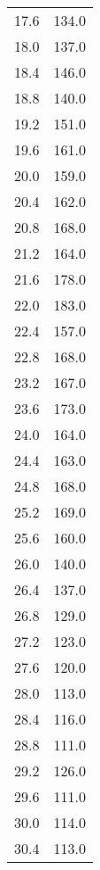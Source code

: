\begin{table}[htp]
\begin{center}
\begin{tabular}{cc}
                        17.6 & 134.0\\
                        18.0 & 137.0\\
                        18.4 & 146.0\\
                        18.8 & 140.0\\
                        19.2 & 151.0\\
                        19.6 & 161.0\\
                        20.0 & 159.0\\
                        20.4 & 162.0\\
                        20.8 & 168.0\\
                        21.2 & 164.0\\
                        21.6 & 178.0\\
                        22.0 & 183.0\\
                        22.4 & 157.0\\
                        22.8 & 168.0\\
                        23.2 & 167.0\\
                        23.6 & 173.0\\
                        24.0 & 164.0\\
                        24.4 & 163.0\\
                        24.8 & 168.0\\
                        25.2 & 169.0\\
                        25.6 & 160.0\\
                        26.0 & 140.0\\
                        26.4 & 137.0\\
                        26.8 & 129.0\\
                        27.2 & 123.0\\
                        27.6 & 120.0\\
                        28.0 & 113.0\\
                        28.4 & 116.0\\
                        28.8 & 111.0\\
                        29.2 & 126.0\\
                        29.6 & 111.0\\
                        30.0 & 114.0\\
                        30.4 & 113.0\\

\end{tabular}
\end{center}
\end{table}
